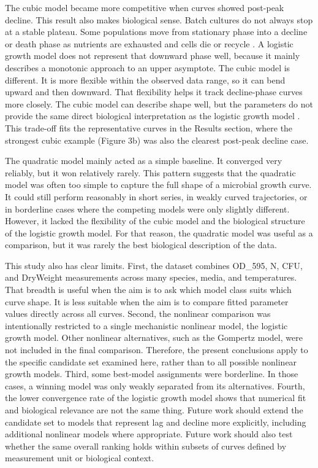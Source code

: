 \documentclass[11pt]{article}
\begin{document}
The cubic model became more competitive when curves showed post-peak decline. This result also makes biological sense. Batch cultures do not always stop at a stable plateau. Some populations move from stationary phase into a decline or death phase as nutrients are exhausted and cells die or recycle \citep{NavarroLlorens2010}. A logistic growth model does not represent that downward phase well, because it mainly describes a monotonic approach to an upper asymptote. The cubic model is different. It is more flexible within the observed data range, so it can bend upward and then downward. That flexibility helps it track decline-phase curves more closely. The cubic model can describe shape well, but the parameters do not provide the same direct biological interpretation as the logistic growth model \citep{WhiteMarshall2019}. This trade-off fits the representative curves in the Results section, where the strongest cubic example (Figure 3b) was also the clearest post-peak decline case.

The quadratic model mainly acted as a simple baseline. It converged very reliably, but it won relatively rarely. This pattern suggests that the quadratic model was often too simple to capture the full shape of a microbial growth curve. It could still perform reasonably in short series, in weakly curved trajectories, or in borderline cases where the competing models were only slightly different. However, it lacked the flexibility of the cubic model and the biological structure of the logistic growth model. For that reason, the quadratic model was useful as a comparison, but it was rarely the best biological description of the data.

This study also has clear limits. First, the dataset combines OD\_595, N, CFU, and DryWeight measurements across many species, media, and temperatures. That breadth is useful when the aim is to ask which model class suits which curve shape. It is less suitable when the aim is to compare fitted parameter values directly across all curves. Second, the nonlinear comparison was intentionally restricted to a single mechanistic nonlinear model, the logistic growth model. Other nonlinear alternatives, such as the Gompertz model, were not included in the final comparison. Therefore, the present conclusions apply to the specific candidate set examined here, rather than to all possible nonlinear growth models. Third, some best-model assignments were borderline. In those cases, a winning model was only weakly separated from its alternatives. Fourth, the lower convergence rate of the logistic growth model shows that numerical fit and biological relevance are not the same thing. Future work should extend the candidate set to models that represent lag and decline more explicitly, including additional nonlinear models where appropriate. Future work should also test whether the same overall ranking holds within subsets of curves defined by measurement unit or biological context. 

\clearpage

\end{document}
